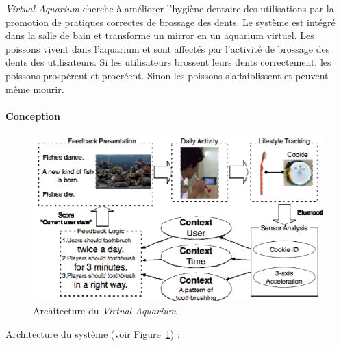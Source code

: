 \documentclass[10pt,a5paper,twoside]{article}
\begin{document}
\emph{Virtual Aquarium} cherche à améliorer l'hygiène dentaire des
utilisations par la promotion de pratiques correctes de brossage des
dents. Le système est intégré dans la salle de bain et transforme un
mirror en un aquarium virtuel. Les poissons vivent dans l'aquarium et
sont affectés par l'activité de brossage des dents des utilisateurs. Si
les utilisateurs brossent leurs dents correctement, les poissons
prospèrent et procréent. Sinon les poissons s'affaiblissent et peuvent
même mourir.

\paragraph{Conception}\label{conception}

\begin{figure}
\centering
\includegraphics[width=0.900\hsize]{images/virtualaquarium-screenshot2.png}
\caption{Architecture du \emph{Virtual
Aquarium}}\label{fig:virtualaquarium1}
\end{figure}

Architecture du système (voir Figure~\ref{fig:virtualaquarium1}) :
\end{document}
